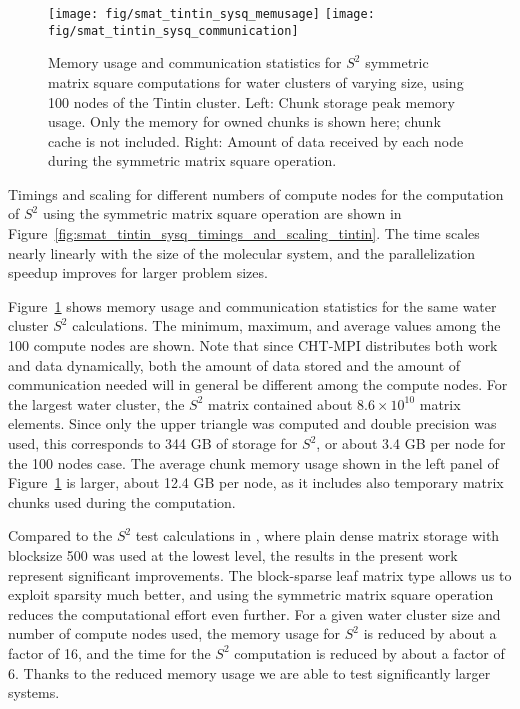 \documentclass{elsarticle}
\begin{document}
\begin{figure}
  \begin{center}
    \texttt{[image: fig/smat\_tintin\_sysq\_memusage]}
    \texttt{[image: fig/smat\_tintin\_sysq\_communication]}
  \end{center}
  \caption{Memory usage and communication statistics for $S^2$ symmetric matrix square computations
    for water clusters of varying size, using 100 nodes of
    the Tintin cluster. Left: Chunk storage peak memory usage. Only
    the memory for owned chunks is shown here; chunk cache is not
    included.  Right: Amount of data received by each node during the
    symmetric matrix square operation.
    \label{fig:smat_tintin_sysq_memusage_mm}}
\end{figure}

Timings and scaling for different numbers of compute nodes for the
computation of $S^2$ using the symmetric matrix square operation are shown
in Figure~\ref{fig:smat_tintin_sysq_timings_and_scaling_tintin}.
The time scales nearly linearly with the size of the
molecular system, and the parallelization speedup improves for larger
problem sizes.

Figure~\ref{fig:smat_tintin_sysq_memusage_mm} shows memory usage and
communication statistics for the same water cluster $S^2$
calculations. The minimum, maximum, and average values among the 100
compute nodes are shown. Note that since CHT-MPI distributes both work
and data dynamically, both the amount of data stored and the amount of
communication needed will in general be different among the compute nodes.
For the largest water cluster, the $S^2$
matrix contained about $8.6 \times 10^{10}$ matrix elements. Since only the
upper triangle was computed and double precision was used, this
corresponds to 344 GB of storage for $S^2$, or about 3.4 GB per node
for the 100 nodes case. The average chunk memory usage shown in the
left panel of Figure~\ref{fig:smat_tintin_sysq_memusage_mm} is larger,
about 12.4 GB per node, as it includes also temporary matrix chunks
used during the computation.

Compared to the $S^2$ test calculations in
\cite{chunks-and-tasks}, where plain dense matrix storage with
blocksize 500 was used at the lowest level, the results in the present
work
represent significant improvements. The block-sparse leaf matrix type
allows us to exploit sparsity much better, and using the symmetric
matrix square operation reduces the computational effort even further.
For a given water cluster size and number of compute nodes used, the
memory usage for $S^2$ is reduced by about a factor of 16, and the 
time for the $S^2$ computation is reduced by about a factor of 6.
Thanks to the reduced memory usage we are able to test significantly
larger systems.
\end{document}
